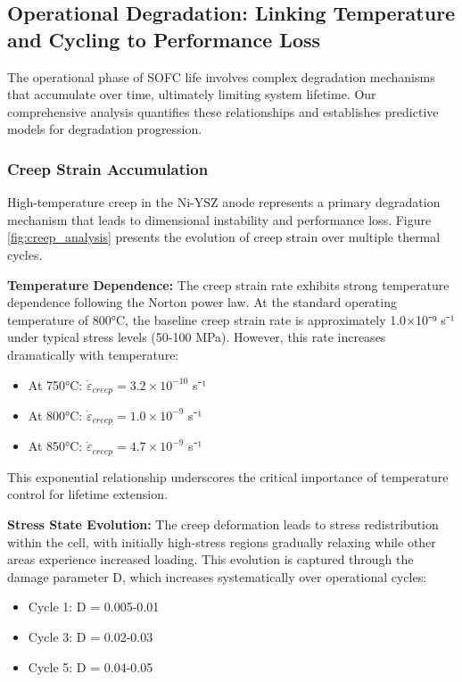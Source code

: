 \documentclass[conference]{IEEEtran}
\begin{document}
\subsection{Operational Degradation: Linking Temperature and Cycling to Performance Loss}

The operational phase of SOFC life involves complex degradation mechanisms that accumulate over time, ultimately limiting system lifetime. Our comprehensive analysis quantifies these relationships and establishes predictive models for degradation progression.

\subsubsection{Creep Strain Accumulation}

High-temperature creep in the Ni-YSZ anode represents a primary degradation mechanism that leads to dimensional instability and performance loss. Figure \ref{fig:creep_analysis} presents the evolution of creep strain over multiple thermal cycles.

\textbf{Temperature Dependence:}
The creep strain rate exhibits strong temperature dependence following the Norton power law. At the standard operating temperature of 800°C, the baseline creep strain rate is approximately 1.0×10⁻⁹ s⁻¹ under typical stress levels (50-100 MPa). However, this rate increases dramatically with temperature:
\begin{itemize}
\item At 750°C: $\dot{\varepsilon}_{creep} = 3.2 \times 10^{-10}$ s⁻¹
\item At 800°C: $\dot{\varepsilon}_{creep} = 1.0 \times 10^{-9}$ s⁻¹
\item At 850°C: $\dot{\varepsilon}_{creep} = 4.7 \times 10^{-9}$ s⁻¹
\end{itemize}

This exponential relationship underscores the critical importance of temperature control for lifetime extension.

\textbf{Stress State Evolution:}
The creep deformation leads to stress redistribution within the cell, with initially high-stress regions gradually relaxing while other areas experience increased loading. This evolution is captured through the damage parameter D, which increases systematically over operational cycles:
\begin{itemize}
\item Cycle 1: D = 0.005-0.01
\item Cycle 3: D = 0.02-0.03
\item Cycle 5: D = 0.04-0.05
\end{itemize}
\end{document}

